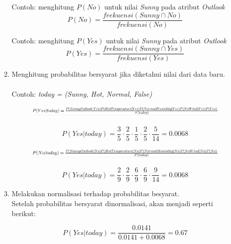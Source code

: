 \documentclass[a4paper,twoside]{article}
\begin{document}
\begin{enumerate}
\begin{enumerate}
Contoh: menghitung $P(No)$ untuk nilai \textit{Sunny} pada atribut \textit{Outlook}
\begin{equation}
P(No) = \frac{frekuensi(Sunny \cap No)}{frekuensi(No)}
\end{equation}

Contoh: menghitung $P(Yes)$ untuk nilai \textit{Sunny} pada atribut \textit{Outlook}
\begin{equation}
P(Yes) = \frac{frekuensi(Sunny \cap Yes)}{frekuensi(Yes)}
\end{equation}

\item Menghitung probabilitas bersyarat jika diketahui nilai dari data baru. \\\\
Contoh: \textit{today = (Sunny, Hot, Normal, False)}
\begin{figure}[H]
	\centering
	\includegraphics[scale=0.73]{naive_bayes3}
	\label{fig:naive_bayes3}
\end{figure}

\begin{equation}
P(Yes|today) = \frac{3}{5} \cdot \frac{2}{5} \cdot \frac{1}{5} \cdot \frac{2}{5} \cdot \frac{5}{14} = 0.0068
\end{equation}

\begin{figure}[H]
	\centering
	\includegraphics[scale=0.73]{naive_bayes4}
	\label{fig:naive_bayes4}
\end{figure}

\begin{equation}
P(Yes|today) = \frac{2}{9} \cdot \frac{2}{9} \cdot \frac{6}{9} \cdot \frac{6}{9} \cdot \frac{9}{14} = 0.0068
\end{equation}

\item Melakukan normalisasi terhadap probabilitas besyarat.\\

Setelah probabilitas bersyarat dinormalisasi, akan menjadi seperti berikut:

\begin{equation}
P(Yes|today) = \frac{0.0141}{0.0141 + 0.0068} = 0.67
\end{equation}


\end{enumerate}
\end{enumerate}
\end{document}
